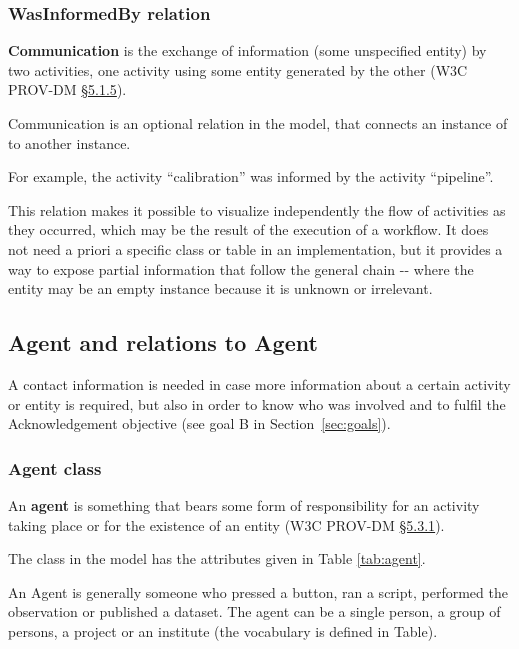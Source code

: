 \subsubsection{WasInformedBy relation}

\textbf{Communication} is the exchange of information (some unspecified entity) by two activities, one activity using some entity generated by the other (W3C PROV-DM \href{https://www.w3.org/TR/prov-dm/#term-Communication}{\S5.1.5}).

Communication is an optional relation  in the model, that connects an instance of  to another instance.

For example, the activity ``calibration'' was informed by the activity ``pipeline''.

This relation makes it possible to visualize independently the flow of activities as they occurred, which may be the result of the execution of a workflow. It does not need a priori a specific class or table in an implementation, but it provides a way to expose partial information that follow the general chain -- where the entity may be an empty instance because it is unknown or irrelevant.


\subsection{Agent and relations to Agent}
\label{sec:agent+relations}

A contact information is needed in case more information about a certain activity or entity is required, but also in order to know who was involved and to fulfil the Acknowledgement objective (see goal B in Section~\ref{sec:goals}).


\subsubsection{Agent class}
\label{sec:agent}

An \textbf{agent} is something that bears some form of responsibility for an activity taking place or for the existence of an entity (W3C PROV-DM \href{https://www.w3.org/TR/prov-dm/#term-agent}{\S5.3.1}).

The  class in the model has the attributes given in Table \ref{tab:agent}. 

An Agent is generally someone who pressed a button, ran a script, performed the observation or published a dataset. The agent can be a single person, a group of persons, a project or an institute (the vocabulary is defined in Table).

